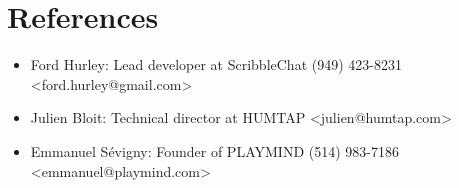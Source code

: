 \documentclass[10pt,a4paper,sans]{moderncv}        %
\begin{document}



\section{References}
\begin{cvcolumns}
  \cvcolumn{}
  {\begin{itemize}
  \item Ford Hurley: Lead developer at ScribbleChat (949) 423-8231 <ford.hurley@gmail.com>
  \item Julien Bloit: Technical director at HUMTAP <julien@humtap.com>
  \item Emmanuel Sévigny: Founder of PLAYMIND (514) 983-7186 <emmanuel@playmind.com>
  \end{itemize}}
\end{cvcolumns}
\end{document}
